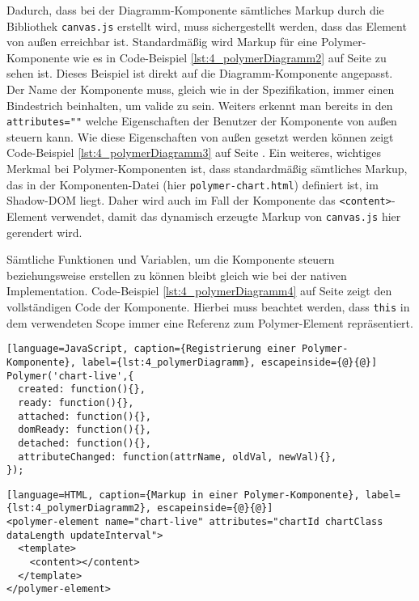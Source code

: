 Dadurch, dass bei der Diagramm-Komponente sämtliches Markup durch die Bibliothek \lstinline|canvas.js| erstellt wird, muss sichergestellt werden, dass das Element von außen erreichbar ist. Standardmäßig wird Markup für eine Polymer-Komponente wie es in Code-Beispiel \ref{lst:4_polymerDiagramm2} auf Seite \pageref{lst:4_polymerDiagramm2} zu sehen ist. Dieses Beispiel ist direkt auf die Diagramm-Komponente angepasst. Der Name der Komponente muss, gleich wie in der Spezifikation, immer einen Bindestrich beinhalten, um valide zu sein. Weiters erkennt man bereits in den \lstinline|attributes=""| welche Eigenschaften der Benutzer der Komponente von außen steuern kann. Wie diese Eigenschaften von außen gesetzt werden können zeigt Code-Beispiel \ref{lst:4_polymerDiagramm3} auf Seite \pageref{lst:4_polymerDiagramm3}. Ein weiteres, wichtiges Merkmal bei Polymer-Komponenten ist, dass standardmäßig sämtliches Markup, das in der Komponenten-Datei (hier \lstinline|polymer-chart.html|) definiert ist, im Shadow-DOM liegt. Daher wird auch im Fall der Komponente das \lstinline|<content>|-Element verwendet, damit das dynamisch erzeugte Markup von \lstinline|canvas.js| hier gerendert wird.

Sämtliche Funktionen und Variablen, um die Komponente steuern beziehungsweise erstellen zu können bleibt gleich wie bei der nativen Implementation. Code-Beispiel \ref{lst:4_polymerDiagramm4} auf Seite \pageref{lst:4_polymerDiagramm4} zeigt den vollständigen Code der Komponente. Hierbei muss beachtet werden, dass \lstinline|this| in dem verwendeten Scope immer eine Referenz zum Polymer-Element repräsentiert.

\begin{lstlisting}[language=JavaScript, caption={Registrierung einer Polymer-Komponente}, label={lst:4_polymerDiagramm}, escapeinside={@}{@}]
Polymer('chart-live',{
  created: function(){},
  ready: function(){},
  attached: function(){},
  domReady: function(){},
  detached: function(){},
  attributeChanged: function(attrName, oldVal, newVal){},
});
\end{lstlisting}

\begin{lstlisting}[language=HTML, caption={Markup in einer Polymer-Komponente}, label={lst:4_polymerDiagramm2}, escapeinside={@}{@}]
<polymer-element name="chart-live" attributes="chartId chartClass dataLength updateInterval">
  <template>
    <content></content>
  </template>
</polymer-element>
\end{lstlisting}

